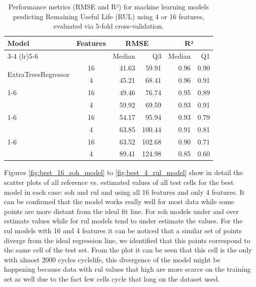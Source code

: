 \begin{table}[H]
    \centering
    \caption{Performance metrics (RMSE and R²) for machine learning models predicting Remaining Useful Life (RUL) using 4 or 16 features, evaluated via 5-fold cross-validation.}
    \label{tab:rul_metrics}
    \begin{tabular}{lcrrrr}
    \toprule
    Model & Features & \multicolumn{2}{c}{RMSE} & \multicolumn{2}{c}{R²} \\
    \cmidrule(lr){3-4} \cmidrule(lr){5-6}
          &          & Median & Q3 & Median & Q1 \\
    \midrule
    \multirow{2}{*}{ExtraTreesRegressor} & 16 & 41.63 & 59.91 & 0.96 & 0.90 \\
                                         & 4  & 45.21 & 68.41 & 0.96 & 0.91 \\
    \cmidrule{1-6}
    \multirow{2}{*}{LGBMRegressor}       & 16 & 49.46 & 76.74 & 0.95 & 0.89 \\
                                         & 4  & 59.92 & 69.59 & 0.93 & 0.91 \\
    \cmidrule{1-6}
    \multirow{2}{*}{KNeighborsRegressor} & 16 & 54.17 & 95.94 & 0.93 & 0.79 \\
                                         & 4  & 63.85 & 100.44 & 0.91 & 0.81 \\
    \cmidrule{1-6}
    \multirow{2}{*}{TweedieRegressor}    & 16 & 63.52 & 102.68 & 0.90 & 0.71 \\
                                         & 4  & 89.41 & 124.98 & 0.85 & 0.60 \\
    \bottomrule
    \end{tabular}
\end{table}

Figures \ref{fig:best_16_soh_model} to \ref{fig:best_4_rul_model} show in detail the scatter plots of all reference vs. estimated values of all test cells for the best model in each case: \ac{soh} and \ac{rul} and using all 16 features and only 4 features. It can be confirmed that the model works really well for most data while some points are more distant from the ideal fit line. For \ac{soh} models under and over estimate values while for \ac{rul} models tend to under estimate the values. For the \ac{rul} models with 16 and 4 features it can be noticed that a similar set of points diverge from the ideal regression line, we identified that this points correspond to the same cell of the test set. From the plot it can be seen that this cell is the only with almost 2000 cycles cyclelife, this divergence of the model might be happening because data with \ac{rul} values that high are more scarce on the training set as well due to the fact few cells cycle that long on the dataset used.

